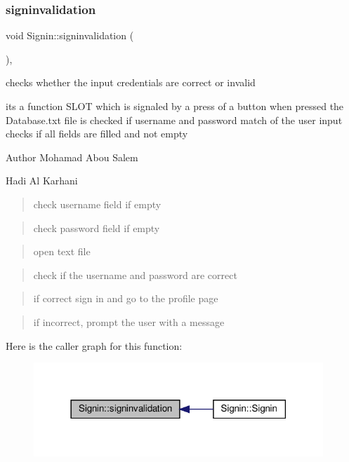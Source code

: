 \subsubsection{\texorpdfstring{signinvalidation}{signinvalidation}}
{\footnotesize\ttfamily void Signin\+::signinvalidation (\begin{DoxyParamCaption}{ }\end{DoxyParamCaption})\hspace{0.3cm}{\ttfamily [private]}, {\ttfamily [slot]}}



checks whether the input credentials are correct or invalid 

its a function S\+L\+OT which is signaled by a press of a button when pressed the Database.\+txt file is checked if username and password match of the user input checks if all fields are filled and not empty

\begin{DoxyAuthor}{Author}
Mohamad Abou Salem 

Hadi Al Karhani 
\end{DoxyAuthor}
\begin{quote}
check username field if empty \end{quote}


\begin{quote}
check password field if empty \end{quote}


\begin{quote}
open text file \end{quote}


\begin{quote}
check if the username and password are correct \end{quote}


\begin{quote}
if correct sign in and go to the profile page \end{quote}


\begin{quote}
if incorrect, prompt the user with a message \end{quote}
Here is the caller graph for this function\+:
\nopagebreak
\begin{figure}[H]
\begin{center}
\leavevmode
\includegraphics[width=309pt]{classSignin_a0a6afd65a4526eec5cbc68e84ba35852_icgraph}
\end{center}
\end{figure}
\mbox{\label{classSignin_af4276b4dc2cbbdba1f88746ad6d97dbd}} 
